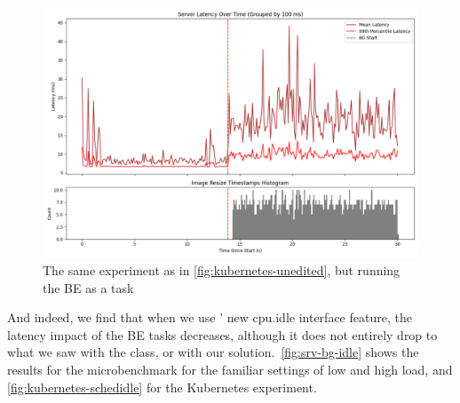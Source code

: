\begin{figure}[t]
    \centering
    \includegraphics[width=\columnwidth]{graphs/kubernetes-idle.png}
    \caption{The same experiment as in \autoref{fig:kubernetes-unedited}, but
    running the BE as a \schedidle{} task}\label{fig:kubernetes-idle}
\end{figure}

And indeed, we find that when we use \cgroups{}' new cpu.idle interface feature,
the latency impact of the BE tasks decreases, although it does not entirely drop
to what we saw with the \fifoclass{} class, or with our \schedbe{} solution.\
\autoref{fig:srv-bg-idle} shows the results for the microbenchmark for the
familiar settings of low and high load, and \autoref{fig:kubernetes-schedidle}
for the Kubernetes experiment.
